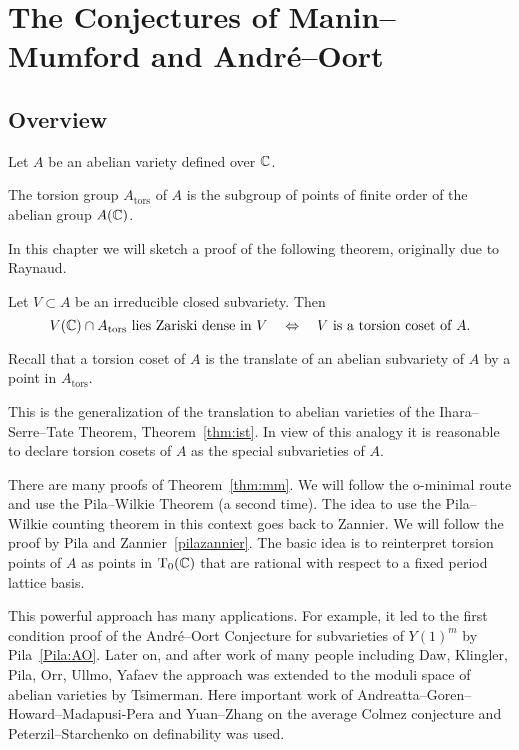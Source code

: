 \chapter{The Conjectures of Manin--Mumford and Andr\'e--Oort}

\section{Overview}

Let $A$ be an abelian variety defined over ${\mathbb{C}}$.

\begin{definition}
  The torsion group $A_{\mathrm{tors}}$ of $A$ is the subgroup of points
  of finite order of the abelian group $A({\mathbb{C}})$.
\end{definition}

In this chapter we will sketch a proof of the following theorem,
originally due to Raynaud.

\begin{theorem}
  Let $V\subset A$ be an irreducible closed subvariety. Then
  \begin{equation*}
    V({\mathbb{C}}) \cap A_{\mathrm{tors}} \text{ lies Zariski dense in
      $V$}\quad\Leftrightarrow \quad
    \text{$V$ is a torsion coset of $A$.}
  \end{equation*}
\end{theorem}

Recall that a torsion coset of $A$ is the translate of an abelian
subvariety of $A$ by a point in $A_{\mathrm{tors}}$. 

This is the generalization of the translation to abelian varieties of
the Ihara--Serre--Tate Theorem, Theorem~\ref{thm:ist}. In view of this
analogy it is reasonable to declare torsion cosets of $A$ as the
special subvarieties of $A$.

There are many proofs of Theorem~\ref{thm:mm}. We will follow the
o-minimal route and use the Pila--Wilkie Theorem (a second time). The
idea to use the Pila--Wilkie counting theorem in this context goes
back to Zannier. We will follow the proof by Pila and
Zannier~\ref{pilazannier}. The basic idea is to reinterpret torsion
points of $A$ as points in $\mathrm{T}_0({\mathbb{C}})$ that are rational with
respect to a fixed period lattice basis.

This powerful approach has many applications. For example, it led to
the first condition proof of the Andr\'e--Oort Conjecture for
subvarieties of $Y(1)^m$ by Pila~\ref{Pila:AO}. Later on, and after work of
many people including Daw, Klingler, Pila, Orr, Ullmo, Yafaev the
approach was extended to the moduli space of abelian varieties by
Tsimerman. Here important work of
Andreatta--Goren--Howard--Madapusi-Pera and Yuan--Zhang on the average
Colmez conjecture and Peterzil--Starchenko on definability was used.


